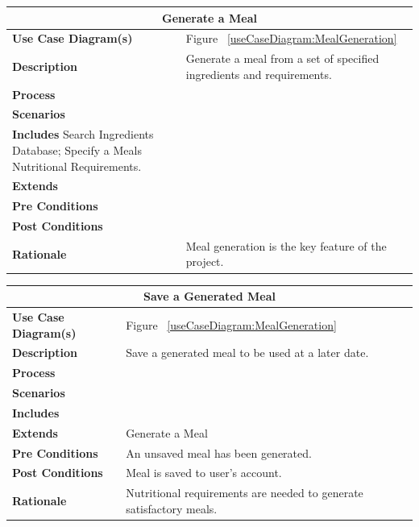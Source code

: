 \documentclass[12pt]{article}
\begin{document}
\begin{center}
\begin{tabularx}{\textwidth}{ |X|X|}
\hline
\multicolumn{2}{|c|}{\textbf{Generate a Meal}}\\
\hline
\hline
\textbf{Use Case Diagram(s)} & Figure ~\ref{useCaseDiagram:MealGeneration}\\ \hline
\textbf{Description} & Generate a meal from a set of specified ingredients and requirements.\\ \hline
\textbf{Process} & \\ \hline
\textbf{Scenarios} & \\ \hline
\textbf{Includes} Search Ingredients Database; Specify a Meals Nutritional Requirements. & \\ \hline
\textbf{Extends} &  \\ \hline
\textbf{Pre Conditions} & \\ \hline
\textbf{Post Conditions} & \\ \hline
\textbf{Rationale} & Meal generation is the key feature of the project.\\ \hline
\end{tabularx}
\end{center}


\begin{center}
\begin{tabularx}{\textwidth}{ |X|X|}
\hline
\multicolumn{2}{|c|}{\textbf{Save a Generated Meal}}\\
\hline
\hline
\textbf{Use Case Diagram(s)} & Figure ~\ref{useCaseDiagram:MealGeneration}\\ \hline
\textbf{Description} & Save a generated meal to be used at a later date.\\ \hline
\textbf{Process} & \\ \hline
\textbf{Scenarios} & \\ \hline
\textbf{Includes} & \\ \hline
\textbf{Extends} & Generate a Meal  \\ \hline
\textbf{Pre Conditions} & An unsaved meal has been generated.\\ \hline
\textbf{Post Conditions} & Meal is saved to user's account.\\ \hline
\textbf{Rationale} & Nutritional requirements are needed to generate satisfactory meals.\\ \hline
\end{tabularx}
\end{center}
\end{document}
